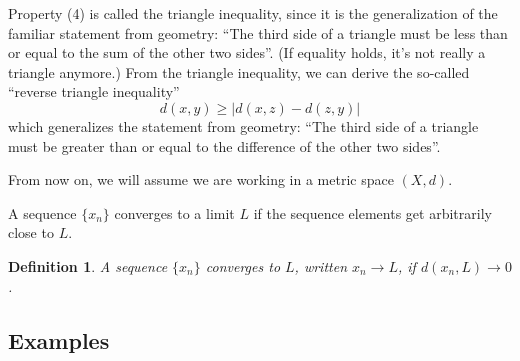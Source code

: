 \documentclass[10pt]{article}         %
\newtheorem{definition}{Definition}[section]
\theoremstyle{remark}
\begin{document}
Property (4) is called the triangle inequality, since it is the generalization of the familiar statement from geometry: ``The third side of a triangle must be less than or equal to the sum of the other two sides''. (If equality holds, it's not really a triangle anymore.) From the triangle inequality, we can derive the so-called ``reverse triangle inequality''
\[
d(x,y) \geq  |d(x,z) - d(z, y)|
\]
which generalizes the statement from geometry: ``The third side of a triangle must be greater than or equal to the difference of the other two sides''. 

From now on, we will assume we are working in a metric space $(X, d)$.

A sequence $\{x_n\}$ converges to a limit $L$ if the sequence elements get arbitrarily close to $L$.

\begin{definition}
A sequence $\{x_n\}$ \emph{converges} to $L$, written $x_n \rightarrow L$, if $d(x_n, L) \rightarrow 0$.
\end{definition}

\subsection{Examples}
\end{document}
